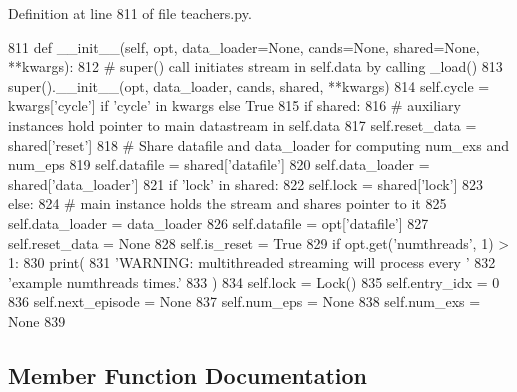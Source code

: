 Definition at line 811 of file teachers.\+py.


\begin{DoxyCode}
811     \textcolor{keyword}{def }\_\_init\_\_(self, opt, data\_loader=None, cands=None, shared=None, **kwargs):
812         \textcolor{comment}{# super() call initiates stream in self.data by calling \_load()}
813         super().\_\_init\_\_(opt, data\_loader, cands, shared, **kwargs)
814         self.cycle = kwargs[\textcolor{stringliteral}{'cycle'}] \textcolor{keywordflow}{if} \textcolor{stringliteral}{'cycle'} \textcolor{keywordflow}{in} kwargs \textcolor{keywordflow}{else} \textcolor{keyword}{True}
815         \textcolor{keywordflow}{if} shared:
816             \textcolor{comment}{# auxiliary instances hold pointer to main datastream in self.data}
817             self.reset\_data = shared[\textcolor{stringliteral}{'reset'}]
818             \textcolor{comment}{# Share datafile and data\_loader for computing num\_exs and num\_eps}
819             self.datafile = shared[\textcolor{stringliteral}{'datafile'}]
820             self.data\_loader = shared[\textcolor{stringliteral}{'data\_loader'}]
821             \textcolor{keywordflow}{if} \textcolor{stringliteral}{'lock'} \textcolor{keywordflow}{in} shared:
822                 self.lock = shared[\textcolor{stringliteral}{'lock'}]
823         \textcolor{keywordflow}{else}:
824             \textcolor{comment}{# main instance holds the stream and shares pointer to it}
825             self.data\_loader = data\_loader
826             self.datafile = opt[\textcolor{stringliteral}{'datafile'}]
827             self.reset\_data = \textcolor{keywordtype}{None}
828             self.is\_reset = \textcolor{keyword}{True}
829             \textcolor{keywordflow}{if} opt.get(\textcolor{stringliteral}{'numthreads'}, 1) > 1:
830                 print(
831                     \textcolor{stringliteral}{'WARNING: multithreaded streaming will process every '}
832                     \textcolor{stringliteral}{'example numthreads times.'}
833                 )
834                 self.lock = Lock()
835         self.entry\_idx = 0
836         self.next\_episode = \textcolor{keywordtype}{None}
837         self.num\_eps = \textcolor{keywordtype}{None}
838         self.num\_exs = \textcolor{keywordtype}{None}
839 
\end{DoxyCode}


\subsection{Member Function Documentation}
\mbox{\label{classparlai_1_1core_1_1teachers_1_1StreamDialogData_a34ba92f60661471fee4eedb5ee2b9eda}} 
